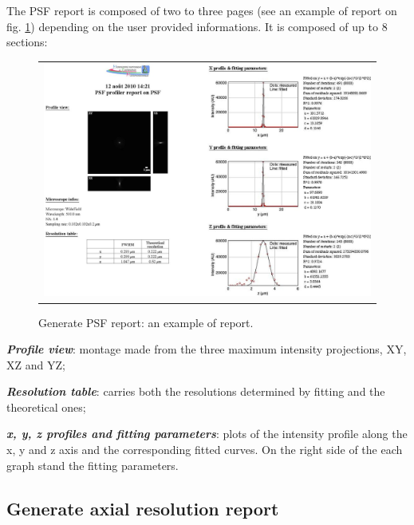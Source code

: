 \documentclass[]{spie}
\begin{document}
The PSF report is composed of two to three pages (see an example of report on fig. \ref{fig:gpr-report}) depending on the user provided informations. It is composed of up to 8 sections:
\begin{figure}[h]
		\begin{center}
		\begin{tabular}{c}
			\includegraphics[width=0.9\linewidth]{img/gpr-report}
		\end{tabular}
	\end{center}
	\caption{\label{fig:gpr-report}Generate PSF report: an example of report.}
\end{figure} 
\begin{itemize*}
	\item \textbf{\textit{Profile view}}: montage made from the three maximum intensity projections, XY, XZ and YZ;
	\item \textbf{\textit{Resolution table}}: carries both the resolutions determined by fitting and the theoretical ones;
	\item \textbf{\textit{x, y, z profiles and fitting parameters}}: plots of the intensity profile along the x, y and z axis and the corresponding fitted curves. On the right side of the each graph stand the fitting parameters.
\end{itemize*}

\subsection{Generate axial resolution report}
\label{subsec:gaar}
\end{document}
